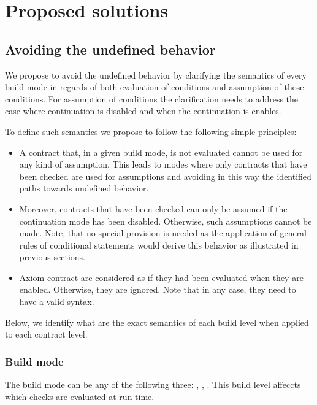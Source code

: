 \section{Proposed solutions}

\subsection{Avoiding the undefined behavior}

We propose to avoid the undefined behavior by clarifying the semantics of every
build mode in regards of both evaluation of conditions and assumption of those
conditions. For assumption of conditions the clarification needs to address the
case where continuation is disabled and when the continuation is enables.

To define such semantics we propose to follow the following simple principles:

\begin{itemize}

\item A contract that, in a given build mode, is not evaluated cannot be used
for any kind of assumption. This leads to modes where only contracts that have
been checked are used for assumptions and avoiding in this way the identified
paths towards undefined behavior.

\item Moreover, contracts that have been checked can only be assumed if the
continuation mode has been disabled. Otherwise, such assumptions cannot be made.
Note, that no special provision is needed as the application of general rules
of conditional statements would derive this behavior as illustrated in previous
sections.

\item Axiom contract are considered as if they had been evaluated 
when they are enabled. Otherwise, they are ignored.
Note that in any case, they need to have a valid syntax.

\end{itemize}

Below, we identify what are the exact semantics of each build level when applied
to each contract level.

\subsubsection{Build mode}

The build mode can be any of the following three: , , 
. This build level affeccts which checks are evaluated at run-time.

